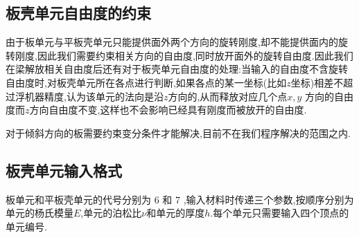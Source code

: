 \subsection{板壳单元自由度的约束}
由于板单元与平板壳单元只能提供面外两个方向的旋转刚度,却不能提供面内的旋转刚度,因此我们需要约束相关方向的自由度,同时放开面外的旋转自由度.因此我们在梁解放相关自由度后还有对于板壳单元自由度的处理:当输入的自由度不含旋转自由度时,对板壳单元所在各点进行判断,如果各点的某一坐标(比如$z$坐标)相差不超过浮机器精度,认为该单元的法向是沿$z$方向的,从而释放对应几个点$x,y$ 方向的自由度而$z$方向自由度不变,这样也不会影响已经具有刚度而被放开的自由度.

对于倾斜方向的板需要约束变分条件才能解决,目前不在我们程序解决的范围之内.

\subsection{板壳单元输入格式}
板单元和平板壳单元的代号分别为 6 和 7 ,输入材料时传递三个参数,按顺序分别为单元的杨氏模量$E$,单元的泊松比$\nu$和单元的厚度$h$.每个单元只需要输入四个顶点的单元编号.

